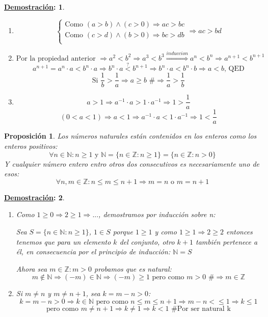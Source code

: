 \documentclass[10pt,a4paper,openright]{book}
\theoremstyle{break}
\newtheorem*{prop}{Proposición}
\newtheorem*{demo}{\underline{Demostración}:}
\begin{document}
\begin{demo}
\begin{enumerate}
$$\begin{cases}
a>0 \Rightarrow b<0 & \mbox{Si fuese } b>0\Rightarrow ab>0 \mbox{ \#}\\
a<0 \Rightarrow b>0 & \mbox{Si fuese } b<0\Rightarrow ab>0 \mbox{ \#}
\end{cases}
$$
\item $$
\begin{cases}
\mbox{Como } (a>b) \wedge (c>0)\Rightarrow ac>bc   \\
\mbox{Como } (c>d) \wedge (b>0)\Rightarrow bc>db   \\
\end{cases}
\Rightarrow ac>bd
$$
\item $$\mbox{Por la propiedad anterior }\Rightarrow a^2<b^2\Rightarrow a^3<b^3\stackrel{induccion}{\Rightarrow} a^n<b^n\Rightarrow a^{n+1}<b^{n+1}$$
$$a^{n+1}=a^n\cdot a<b^n\cdot a\Rightarrow b^n\cdot a\stackrel{?}{<}b^{n+1}\Rightarrow b^n\cdot a< b^n\cdot b \Rightarrow a<b \mbox{, QED}$$
$$\mbox{Si } \frac{1}{b}>\frac{1}{a}\Rightarrow a\geq b \mbox{ \#}\Rightarrow \frac{1}{a}>\frac{1}{b}$$
\item $$a>1\Rightarrow a^{-1}\cdot a>1\cdot a^{-1}\Rightarrow 1>\frac{1}{a}$$
$$(0<a<1)\Rightarrow a<1\Rightarrow a^{-1}\cdot a<1\cdot a^{-1}\Rightarrow 1<\frac{1}{a}$$
\end{enumerate}
\end{demo}

\begin{prop}
Los números naturales están contenidos en los enteros como los enteros positivos:
$$\forall n \in \mathbb N: n\geq 1 \mbox{ y } \mathbb N =\{n\in \mathbb Z: n\geq 1\}=\{n\in \mathbb Z : n>0\}$$
Y cualquier número entero entro otros dos consecutivos es necesariamente uno de esos:
$$\forall n,m\in \mathbb Z : n\leq m\leq n+1\Rightarrow m=n\mbox{ o } m=n+1$$
\end{prop}
\begin{demo}
\begin{enumerate}
\item Como $1\geq 0\Rightarrow 2\geq 1 \Rightarrow ...$, demostramos por inducción sobre n:\par
Sea $S=\{n\in \mathbb N: n\geq 1\}$, $1\in S$ porque $1\geq 1$ y como $1\geq 1\Rightarrow 2\geq 2$ entonces tenemos que para un elemento $k$ del conjunto, otro $k+1$ también pertenece a él, en consecuencia por el principio de inducción: $\mathbb N=S$\par
Ahora sea $m\in \mathbb Z: m>0$ probamos  que es natural:
$$m\notin \mathbb N \Rightarrow (-m)\in \mathbb N \Rightarrow (-m)\geq  1\mbox{ pero como }m>0 \mbox{ \#}\Rightarrow m\in \mathbb Z$$
\vspace{0.5cm}
\item Si $m\neq n$ y $m\neq n+1$, sea $k=m-n>0$:
$$k=m-n>0\Rightarrow k\in \mathbb N \mbox{ pero como }n\leq m \leq n+1\Rightarrow m-n<\leq 1 \Rightarrow k\leq 1$$
$$\mbox{ pero como }m\neq n+1\Rightarrow k\neq 1\Rightarrow k<1\mbox{ \# Por ser natural k }$$
\end{enumerate}
\end{demo}
\end{document}
